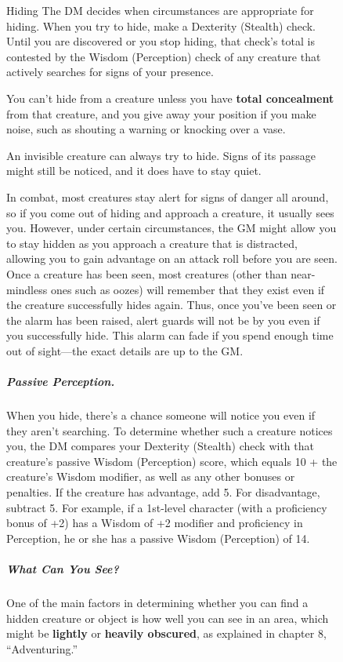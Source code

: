 \begin{figure}[htb]
    \begin{DndSidebar}{Hiding}
The DM decides when circumstances are appropriate for hiding. When you try to hide, make a Dexterity (Stealth) check. Until you are discovered or you stop hiding, that check's total is contested by the Wisdom (Perception) check of any creature that actively searches for signs of your presence.

You can't hide from a creature unless you have \textbf{total concealment} from that creature, and you give away your position if you make noise, such as shouting a warning or knocking over a vase.

An invisible creature can always try to hide. Signs of its passage might still be noticed, and it does have to stay quiet.

In combat, most creatures stay alert for signs of danger all around, so if you come out of hiding and approach a creature, it usually sees you. However, under certain circumstances, the GM might allow you to stay hidden as you approach a creature that is distracted, allowing you to gain advantage on an attack roll before you are seen. Once a creature has been seen, most creatures (other than near-mindless ones such as oozes) will remember that they exist even if the creature successfully hides again. Thus, once you've been seen or the alarm has been raised, alert guards will not be  by you even if you successfully hide. This alarm can fade if you spend enough time out of sight---the exact details are up to the GM.

\subparagraph*{Passive Perception.} When you hide, there's a chance someone will notice you even if they aren't searching. To determine whether such a creature notices you, the DM compares your Dexterity (Stealth) check with that creature's passive Wisdom (Perception) score, which equals 10 + the creature's Wisdom modifier, as well as any other bonuses or penalties. If the creature has advantage, add 5. For disadvantage, subtract 5. For example, if a 1st-level character (with a proficiency bonus of +2) has a Wisdom of +2 modifier and proficiency in Perception, he or she has a passive Wisdom (Perception) of 14.

\subparagraph*{What Can You See?} One of the main factors in determining whether you can find a hidden creature or object is how well you can see in an area, which might be \textbf{lightly} or \textbf{heavily obscured}, as explained in chapter 8, “Adventuring.”
\end{DndSidebar}
\end{figure}
